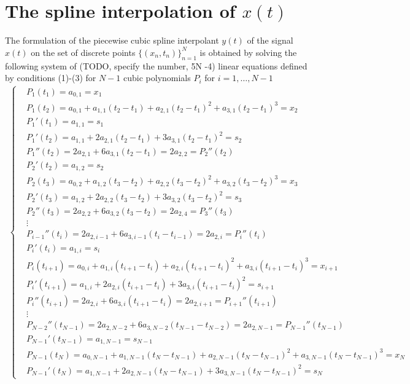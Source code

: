 \documentclass[article,moreauthors,pdftex,10pt,a4paper]{ssrn}
\begin{document}
\section{The spline interpolation of $x(t)$}
The formulation of the piecewise cubic spline interpolant $y(t)$ of the signal $x(t)$ on the set of discrete points $\Big\{ (x_n, t_n) \Big\}_{n = 1}^N$ is obtained by solving the following system of (TODO, specify the number, 5N -4) linear equations defined  by conditions (1)-(3) for $N-1$ cubic polynomials $P_i$ for $i = 1,\ldots, N-1$
\begin{align*}
\begin{cases}
& P_1(t_1) = a_{0,1} = x_1 \\
& P_1(t_2) = a_{0,1} + a_{1,1} (t_2 - t_1)  + a_{2,1} (t_2 - t_1)^2 + a_{3,1} (t_2 - t_1)^3 = x_2 \\
& P_1'(t_1) =  a_{1,1}  = s_1 \\
& P_1'(t_2) =  a_{1,1}   + 2 a_{2,1} (t_2 - t_1) + 3a_{3,1} (t_2 - t_1)^2 = s_2 \\
& P_1''(t_2) = 2 a_{2,1} + 6a_{3,1} (t_2 - t_1) = 2 a_{2,2} = P_2''(t_2)  \\
& P_2'(t_2) =  a_{1,2}   = s_2 \\
& P_2 (t_3) =   a_{0,2} + a_{1,2} (t_3 - t_2)  + a_{2,2} (t_3 - t_2)^2 + a_{3,2} (t_3 - t_2)^3 = x_3 \\
& P_2' (t_3) =  a_{1,2}  + 2a_{2,2} (t_3 - t_2) + 3a_{3,2} (t_3 - t_2)^2 = s_3 \\
& P_2'' (t_3) =   2a_{2,2} + 6a_{3,2} (t_3 - t_2) = 2 a_{2,4} = P_3''(t_3) \\
& \vdots \\
& P_{i-1}''(t_i) = 2 a_{2,i-1} + 6a_{3,i-1} (t_i - t_{i-1}) = 2 a_{2,i} = P_i''(t_i)  \\
& P_i'(t_i) =  a_{1,i}   = s_i \\
& P_i (t_{i+1}) =   a_{0,i} + a_{1,i} (t_{i+1} - t_i)  + a_{2,i} (t_{i+1} - t_i)^2 + a_{3,i} (t_{i+1} - t_i)^3 = x_{i+1} \\
& P_i' (t_{i+1}) =  a_{1,i}  + 2a_{2,i} (t_{i+1} - t_i) + 3a_{3,i} (t_{i+1} - t_i)^2 = s_{i+1} \\
& P_i'' (t_{i+1}) =   2a_{2,i} + 6a_{3,i} (t_{i+1} - t_i) = 2 a_{2,i+1} = P_{i+1}''(t_{i+1}) \\
& \vdots \\
& P_{N-2}''(t_{N-1}) = 2 a_{2,N-2} + 6a_{3,N-2} (t_{N-1} - t_{N-2}) = 2 a_{2,N-1} = P_{N-1}''(t_{N-1})  \\
& P_{N-1}'(t_{N-1}) =  a_{1,N-1}   = s_{N-1} \\
& P_{N-1} (t_N) =   a_{0,N-1} + a_{1,N-1} (t_N - t_{N-1})  + a_{2,N-1} (t_N - t_{N-1})^2 + a_{3,N-1} (t_N - t_{N-1})^3 = x_N \\
& P_{N-1}' (t_N) =  a_{1,N-1}  + 2a_{2,N-1} (t_N - t_{N-1}) + 3a_{3,N-1} (t_N - t_{N-1})^2 = s_N
\end{cases}
\end{align*}
\end{document}
